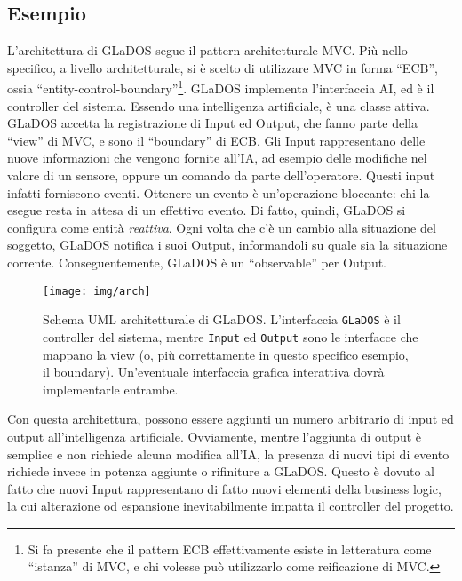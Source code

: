 \documentclass[a4paper,12pt]{report}
\begin{document}
	
	
	\subsection*{Esempio}
	
	L'architettura di GLaDOS segue il pattern architetturale MVC.
	Più nello specifico, a livello architetturale, si è scelto di utilizzare MVC in forma ``ECB'', ossia ``entity-control-boundary''\footnote{
		Si fa presente che il pattern ECB effettivamente esiste in letteratura come ``istanza'' di MVC, e chi volesse può utilizzarlo come reificazione di MVC.
	}.
	GLaDOS implementa l'interfaccia AI, ed è il controller del sistema.
	Essendo una intelligenza artificiale, è una classe attiva.
	GLaDOS accetta la registrazione di Input ed Output, che fanno parte della ``view'' di MVC, e sono il ``boundary'' di ECB.
	Gli Input rappresentano delle nuove informazioni che vengono fornite all'IA, ad esempio delle modifiche nel valore di un sensore, oppure un comando da parte dell'operatore.
	Questi input infatti forniscono eventi.
	Ottenere un evento è un'operazione bloccante: chi la esegue resta in attesa di un effettivo evento.
	Di fatto, quindi, GLaDOS si configura come entità \textit{reattiva}.
	Ogni volta che c'è un cambio alla situazione del soggetto, GLaDOS notifica i suoi Output,
	informandoli su quale sia la situazione corrente.
	Conseguentemente, GLaDOS è un ``observable'' per Output.
	
	\begin{figure}[h]
		\centering{}
		\texttt{[image: img/arch]}
		\caption{Schema UML architetturale di GLaDOS. L'interfaccia \texttt{GLaDOS} è il controller del sistema, mentre \texttt{Input} ed \texttt{Output} sono le interfacce che mappano la view (o, più correttamente in questo specifico esempio, il boundary). Un'eventuale interfaccia grafica interattiva dovrà implementarle entrambe.}
		\label{img:goodarch}
	\end{figure}
	
	Con questa architettura, possono essere aggiunti un numero arbitrario di input ed output
	all'intelligenza artificiale.
	Ovviamente, mentre l'aggiunta di output è semplice e non richiede alcuna modifica all'IA, la
	presenza di nuovi tipi di evento richiede invece in potenza aggiunte o rifiniture a GLaDOS.
	Questo è dovuto al fatto che nuovi Input rappresentano di fatto nuovi elementi della business
	logic, la cui alterazione od espansione inevitabilmente impatta il controller del progetto.
	
\end{document}

